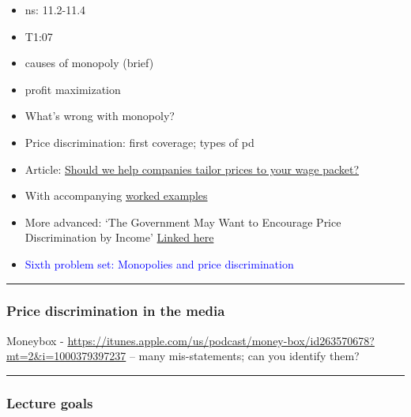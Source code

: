\documentclass[]{article}
\begin{document}
\begin{itemize}
\item
  ns: 11.2-11.4
\item
  T1:07
\item
  causes of monopoly (brief)
\item
  profit maximization
\item
  What's wrong with monopoly?
\item
  Price discrimination: first coverage; types of pd
\item
  Article:
  \href{https://theconversation.com/should-we-help-companies-tailor-prices-to-your-wage-packet-47719}{Should
  we help companies tailor prices to your wage packet?}
\item
  With accompanying
  \href{https://docs.google.com/document/d/16jos_PT9w1wGpyD5A8ZiWJ9HW6kaLOJH6EWc_AYWnkk/pub}{worked
  examples}
\item
  More advanced: `The Government May Want to Encourage Price
  Discrimination by Income'
  \href{https://davidreinstein.wordpress.com/research-and-publications/}{Linked
  here}
\item
  \textcolor{blue}{Sixth problem set: Monopolies and price discrimination}
\end{itemize}

\begin{center}\rule{0.5\linewidth}{\linethickness}\end{center}

\hypertarget{price-discrimination-in-the-media}{%
\subsubsection{Price discrimination in the
media}\label{price-discrimination-in-the-media}}

Moneybox -
\url{https://itunes.apple.com/us/podcast/money-box/id263570678?mt=2&i=1000379397237}
-- many mis-statements; can you identify them?

\begin{center}\rule{0.5\linewidth}{\linethickness}\end{center}

\hypertarget{lecture-goals}{%
\subsubsection{Lecture goals}\label{lecture-goals}}
\end{document}
